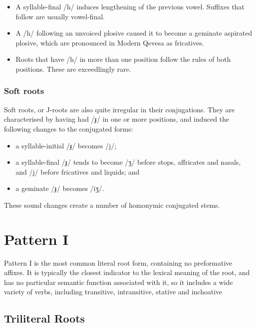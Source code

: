 \documentclass[grammar]{subfiles}
\begin{document}
\begin{itemize}
  \item A syllable-final /h/ induces lengthening of the previous vowel.  Suffixes
    that follow are usually vowel-final.
  \item A /h/ following an unvoiced plosive caused it to become a geminate
    aspirated plosive, which are pronounced in Modern Qevesa as fricatives.
  \item Roots that have /h/ in more than one position follow the rules of both
    positions.  These are exceedlingly rare.
\end{itemize}


\subsubsection{Soft roots}
\label{sssec:vm_soft_roots}

Soft roots, or J-roots are also quite irregular in their conjugations. They are
characterised by having had /ɟ/ in one or more positions, and induced the
following changes to the conjugated forms: 

\begin{itemize}
  \item a syllable-initial /ɟ/ becomes /j/; 
  \item a syllable-final /ɟ/ tends to become /ʒ/ before stops, affricates and
    nasals, and /j/ before fricatives and liquids; and
  \item a geminate /ɟ/ becomes /iʒ/. 
\end{itemize}

These sound changes create a number of homonymic conjugated stems. 


\section{Pattern I}
\label{sec:vm_verb_pattern_i}

Pattern I is the most common literal root form, containing no preformative
affixes.  It is typically the closest indicator to the lexical meaning of the
root, and has no particular semantic function associated with it, so it
includes a wide variety of verbs, including transitive, intransitive, stative
and inchoative


\subsection{Triliteral Roots}
\label{ssec:vm_i_triliteral}
%
%
\end{document}
